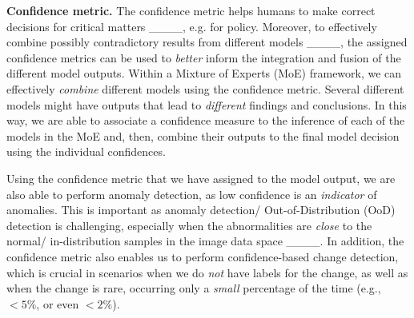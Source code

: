 \iffalse     
In addition, for benchmarking and comparing EO FMs, a single combined evaluation metric has to include the performance accuracy on different \textit{diverse} downstream tasks, also including in the evaluation metric how diverse  
these use cases are, the number of labeled data in the $n$-shot downstream tasks, confidence quantification and assessment, the number of model weights retrained 
and the training epochs needed for convergence. 
\fi 



\textbf{Confidence metric.}   
The confidence metric helps humans to make correct decisions for critical matters ____, e.g. for policy.      
Moreover, to effectively combine possibly contradictory results from different models ____, the assigned confidence metrics can be used to \textit{better}       inform the integration and fusion of the different model outputs.      
Within a Mixture of Experts (MoE) framework, we can effectively \textit{combine} different models using the confidence metric.     
Several different models might have outputs that lead to \textit{different} findings and conclusions.         
In this way, we are able to associate a confidence measure to the inference of each of the models in the MoE and, then, combine their outputs to the final model decision using the individual confidences.

Using the confidence metric that we have assigned to the model output, we are also able to perform anomaly detection, as low confidence is an \textit{indicator} of anomalies.       
This is important as anomaly detection/ Out-of-Distribution (OoD) detection is challenging, especially when the abnormalities are \textit{close} to the normal/ in-distribution samples in the image data space ____.               
In addition, the confidence metric also enables us to perform confidence-based change detection, which is crucial in scenarios when we do \textit{not} have labels for the change, as well as when the change is rare, occurring only a \textit{small} percentage of the time (e.g., $<5\%$, or even $<2\%$).















